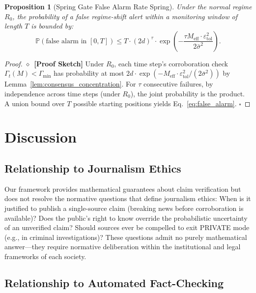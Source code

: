 \documentclass[11pt,a4paper]{article}
\newtheorem{proposition}[theorem]{Proposition}
\theoremstyle{definition}
\newcommand{\rigorSketch}[0]{$\diamond$~\textbf{[Proof Sketch]}}
\newcommand{\Pbb}{\mathbb{P}}
\newcommand{\VISprivate}{\textsc{PRIVATE}}
\begin{document}
\begin{proposition}[Spring Gate False Alarm Rate Spring]
\label{prop:spring_false_alarm}
Under the normal regime $R_0$, the probability of a false regime-shift alert within a monitoring window of length $T$ is bounded by:
\begin{equation}
    \Pbb(\text{false alarm in } [0, T]) \leq T \cdot (2d)^\tau \cdot \exp\left(-\frac{\tau M_{\mathrm{eff}} \cdot \varepsilon_{\mathrm{tol}}^2}{2\bar{\sigma}^2}\right).
    \label{eq:false_alarm}
\end{equation}
\end{proposition}

\begin{proof}\rigorSketch
Under $R_0$, each time step's corroboration check $\Gamma_t(M) < \Gamma_{\min}$ has probability at most $2d \cdot \exp(-M_{\mathrm{eff}} \cdot \varepsilon_{\mathrm{tol}}^2 / (2\bar{\sigma}^2))$ by Lemma~\ref{lem:consensus_concentration}. For $\tau$ consecutive failures, by independence across time steps (under $R_0$), the joint probability is the product. A union bound over $T$ possible starting positions yields Eq.~\eqref{eq:false_alarm}. $\square$
\end{proof}

\section{Discussion }
\label{sec:discussion}

\subsection{Relationship to Journalism Ethics }

Our framework provides mathematical guarantees about claim verification but does not resolve the normative questions that define journalism ethics: When is it justified to publish a single-source claim (breaking news before corroboration is available)? Does the public's right to know override the probabilistic uncertainty of an unverified claim? Should sources ever be compelled to exit \VISprivate{} mode (e.g., in criminal investigations)? These questions admit no purely mathematical answer---they require normative deliberation within the institutional and legal frameworks of each society.

\subsection{Relationship to Automated Fact-Checking }
\end{document}

